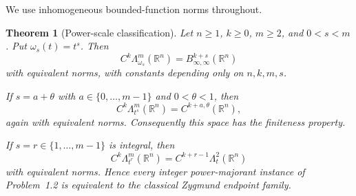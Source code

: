 \documentclass[11pt]{article}
\newtheorem{theorem}{Theorem}
\newcommand{\R}{\mathbb R}
\newcommand{\Besov}[1]{B^{#1}_{\infty,\infty}}
\begin{document}
We use inhomogeneous bounded-function norms throughout.

\begin{theorem}[Power-scale classification]\label{thm:classification}
Let $n\geq1$, $k\geq0$, $m\geq2$, and $0<s<m$.  Put
$\omega_s(t)=t^s$.  Then
\begin{equation}\label{eq:main-equivalence}
 C^k\Lambda^m_{\omega_s}(\R^n)=\Besov{k+s}(\R^n)
\end{equation}
with equivalent norms, with constants depending only on $n,k,m,s$.

If $s=a+\theta$ with $a\in\{0,\ldots,m-1\}$ and $0<\theta<1$, then
\begin{equation}\label{eq:holder}
 C^k\Lambda^m_{t^s}(\R^n)=C^{k+a,\theta}(\R^n),
\end{equation}
again with equivalent norms.  Consequently this space has the finiteness
property.

If $s=r\in\{1,\ldots,m-1\}$ is integral, then
\begin{equation}\label{eq:endpoint}
 C^k\Lambda^m_{t^r}(\R^n)
 =C^{k+r-1}\Lambda^2_t(\R^n)
\end{equation}
with equivalent norms.  Hence every integer power-majorant instance of
Problem~1.2 is equivalent to the classical Zygmund endpoint family.
\end{theorem}
\end{document}
